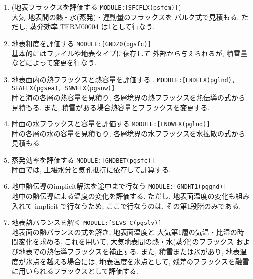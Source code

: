 \begin{enumerate}
  \item (地表フラックスを評価する \texttt{MODULE:[SFCFLX(psfcm)]}) \\
            大気-地表間の熱・水(蒸発)・運動量のフラックスを
            バルク式で見積もる.
            ただし, 蒸発効率 TERM00004 は1として行なう.

  \item 地表粗度を評価する \texttt{MODULE:[GNDZ0(pgsfc)]} \\
            基本的にはファイルや地表タイプに依存して
            外部から与えられるが, 
            積雪量などによって変更を行なう.

  \item 地表面内の熱フラックスと熱容量を評価する .
        \texttt{MODULE:[LNDFLX(pglnd), SEAFLX(pgsea), SNWFLX(pgsnw)]} \\
            陸と海の各層の熱容量を見積り,
            各層境界の熱フラックスを熱伝導の式から見積もる.
            また, 積雪がある場合熱容量とフラックスを変更する.

  \item 陸面の水フラックスと容量を評価する \texttt{MODULE:[LNDWFX(pglnd)]} \\
            陸の各層の水の容量を見積もり, 
            各層境界の水フラックスを水拡散の式から見積もる

  \item 蒸発効率を評価する \texttt{MODULE:[GNDBET(pgsfc)]} \\
            陸面では, 土壌水分と気孔抵抗に依存して計算する. 

  \item 地中熱伝導のimplicit解法を途中まで行なう \texttt{MODULE:[GNDHT1(pggnd)]} \\
            地中の熱伝導による温度の変化を評価する.
            ただし, 地表面温度の変化も組み入れて 
            implicit で行なうため, ここで行なうのは, その第1段階のみである.

  \item 地表熱バランスを解く \texttt{MODULE:[SLVSFC(pgslv)]} \\
            地表面の熱バランスの式を解き, 地表面温度と
            大気第1層の気温・比湿の時間変化を求める.
            これを用いて, 大気地表間の熱・水(蒸発)のフラックス
            および地表での熱伝導フラックスを補正する.
            また, 積雪または氷があり, 地表温度が氷点を越える場合には,
            地表温度を氷点として, 
            残差のフラックスを融雪に用いられるフラックスとして評価する.


\end{enumerate}
